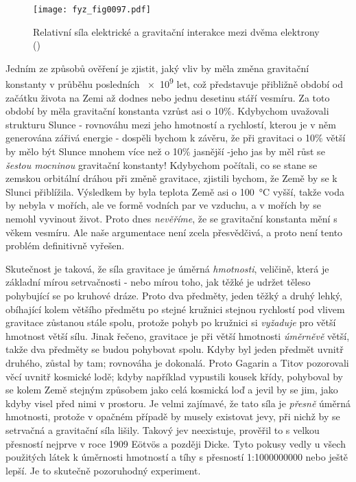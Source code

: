     \begin{figure}[ht!]  %
      \centering
      \texttt{[image: fyz\_fig0097.pdf]}
      \caption{Relativní síla elektrické a gravitační interakce mezi dvěma elektrony
               (\cite[s.~104]{Feynman01})}
      \label{fyz:fig0097}
    \end{figure}
    Jedním ze způsobů ověření je zjistit, jaký vliv by měla změna gravitační konstanty v průběhu 
    posledních \num{e9} let, což představuje přibližně období od začátku života na Zemi až dodnes 
    nebo jednu desetinu stáří vesmíru. Za toto období by měla gravitační konstanta vzrůst asi o 
    10\%. Kdybychom uvažovali strukturu Slunce - rovnováhu mezi jeho hmotností a rychlostí, kterou 
    je v něm generována zářivá energie - dospěli bychom k závěru, že při gravitaci o 10\% větší by 
    mělo být Slunce mnohem více než o 10\% jasnější -jeho jas by měl růst se \emph{šestou mocninou} 
    gravitační konstanty! Kdybychom počítali, co se stane se zemskou orbitální dráhou při změně 
    gravitace, zjistili bychom, že Země by se k Slunci přiblížila. Výsledkem by byla teplota Země 
    asi o \qty{100} {\degreeCelsius} vyšší, takže voda by nebyla v mořích, ale ve formě vodních par 
    ve vzduchu, a v mořích by se nemohl vyvinout život. Proto dnes \emph{nevěříme}, že se 
    gravitační konstanta mění s věkem vesmíru. Ale naše argumentace není zcela přesvědčivá, a proto 
    není tento problém definitivně vyřešen.
    
    Skutečnost je taková, že síla gravitace je úměrná \emph{hmotnosti}, veličině, která je základní 
    mírou setrvačnosti - nebo mírou toho, jak těžké je udržet těleso pohybující se po kruhové 
    dráze. Proto dva předměty, jeden těžký a druhý lehký, obíhající kolem většího předmětu po 
    stejné kružnici stejnou rychlostí pod vlivem gravitace zůstanou stále spolu, protože pohyb po 
    kružnici si \emph{vyžaduje} pro větší hmotnost větší sílu. Jinak řečeno, gravitace je při větší 
    hmotnosti \emph{úměrněvě} větší, takže dva předměty se budou pohybovat spolu. Kdyby byl jeden 
    předmět uvnitř druhého, zůstal by tam; rovnováha je dokonalá. Proto Gagarin a Titov pozorovali 
     věcí uvnitř kosmické lodě; kdyby například vypustili kousek křídy, pohyboval by 
    se kolem Země stejným způsobem jako celá kosmická loď a jevil by se jim, jako kdyby visel před 
    nimi v prostoru. Je velmi zajímavé, že tato síla je	\emph{přesně} úměrná hmotnosti, protože v 
    opačném případě by musely existovat jevy, při nichž by se setrvačná a gravitační síla lišily. 
    Takový jev neexistuje, prověřil to s velkou přesností nejprve v roce \num{1909} E\"{o}tv\"{o}s 
    a později Dicke. Tyto pokusy vedly u všech použitých látek k úměrnosti hmotností a tíhy s 
    přesností 1:\num{1 000 000 000} nebo ještě lepší. Je to skutečně pozoruhodný experiment.
    
